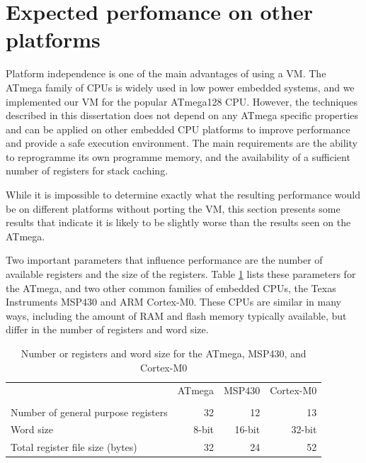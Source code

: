 \section{Expected perfomance on other platforms}
\label{sec-evaluation-other-platforms}
Platform independence is one of the main advantages of using a VM. The ATmega family of CPUs is widely used in low power embedded systems, and we implemented our VM for the popular ATmega128 CPU. However, the techniques described in this dissertation does not depend on any ATmega specific properties and can be applied on other embedded CPU platforms to improve performance and provide a safe execution environment. The main requirements are the ability to reprogramme its own programme memory, and the availability of a sufficient number of registers for stack caching.

While it is impossible to determine exactly what the resulting performance would be on different platforms without porting the VM, this section presents some results that indicate it is likely to be slightly worse than the results seen on the ATmega.

Two important parameters that influence performance are the number of available registers and the size of the registers. Table \ref{tbl-ATmega-msp430-m0-registers} lists these parameters for the ATmega, and two other common families of embedded CPUs, the Texas Instruments MSP430 and ARM Cortex-M0. These CPUs are similar in many ways, including the amount of RAM and flash memory typically available, but differ in the number of registers and word size.

\begin{table}
\caption{Number or registers and word size for the ATmega, MSP430, and Cortex-M0}
\label{tbl-ATmega-msp430-m0-registers}
    \begin{tabular}{lrrr} %
    \toprule
                                           & ATmega       & MSP430     & Cortex-M0 \\
                                           & \cite{Atmel:ATmega128Datasheet, Atmel:AVRInstructionSetManual}
                                           & \cite{TexasInstrumentsIncorporated:MSP430F1611Datasheet, TexasInstrumentsIncorporated:MSP430x1xxUsersGuide}
                                           & \cite{ARM:2009vz} \\
    \midrule
    \midrule
    Number of general purpose registers    & 32           & 12         & 13        \\
    Word size                              & 8-bit        & 16-bit     & 32-bit    \\
    Total register file size (bytes)       & 32           & 24         & 52        \\
    \bottomrule
    \end{tabular}
\end{table}

